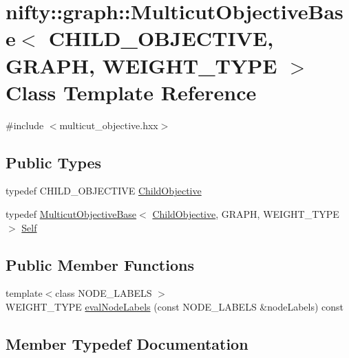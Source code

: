 \hypertarget{classnifty_1_1graph_1_1MulticutObjectiveBase}{}\section{nifty\+:\+:graph\+:\+:Multicut\+Objective\+Base$<$ C\+H\+I\+L\+D\+\_\+\+O\+B\+J\+E\+C\+T\+I\+V\+E, G\+R\+A\+P\+H, W\+E\+I\+G\+H\+T\+\_\+\+T\+Y\+P\+E $>$ Class Template Reference}
\label{classnifty_1_1graph_1_1MulticutObjectiveBase}


{\ttfamily \#include $<$multicut\+\_\+objective.\+hxx$>$}

\subsection*{Public Types}
\begin{DoxyCompactItemize}
\item 
typedef C\+H\+I\+L\+D\+\_\+\+O\+B\+J\+E\+C\+T\+I\+V\+E \hyperlink{classnifty_1_1graph_1_1MulticutObjectiveBase_a7150df879f2ca2a3966d198a02c5aa87}{Child\+Objective}
\item 
typedef \hyperlink{classnifty_1_1graph_1_1MulticutObjectiveBase}{Multicut\+Objective\+Base}$<$ \hyperlink{classnifty_1_1graph_1_1MulticutObjectiveBase_a7150df879f2ca2a3966d198a02c5aa87}{Child\+Objective}, G\+R\+A\+P\+H, W\+E\+I\+G\+H\+T\+\_\+\+T\+Y\+P\+E $>$ \hyperlink{classnifty_1_1graph_1_1MulticutObjectiveBase_a812074f34dac1eb52fd5865b51dbdb28}{Self}
\end{DoxyCompactItemize}
\subsection*{Public Member Functions}
\begin{DoxyCompactItemize}
\item 
{\footnotesize template$<$class N\+O\+D\+E\+\_\+\+L\+A\+B\+E\+L\+S $>$ }\\W\+E\+I\+G\+H\+T\+\_\+\+T\+Y\+P\+E \hyperlink{classnifty_1_1graph_1_1MulticutObjectiveBase_a9cf3579580eb35e1b4156aa35018536f}{eval\+Node\+Labels} (const N\+O\+D\+E\+\_\+\+L\+A\+B\+E\+L\+S \&node\+Labels) const 
\end{DoxyCompactItemize}


\subsection{Member Typedef Documentation}
\hypertarget{classnifty_1_1graph_1_1MulticutObjectiveBase_a7150df879f2ca2a3966d198a02c5aa87}{}
